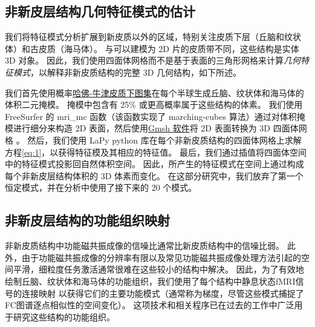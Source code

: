 \documentclass[lang=cn,a4paper,newtx,citestyle=gb7714-2015, bibstyle=gb7714-2015]{elegantpaper}
\begin{document}
\subsection{非新皮层结构几何特征模式的估计} \label{sec:geometric_estimation}

我们将特征模式分析扩展到新皮质以外的区域，特别关注皮质下层（丘脑和纹状体）和古皮质（海马体）。
与可以建模为 2D 片的皮质带不同，这些结构是实体 3D 对象。 
因此，我们使用四面体网格而不是基于表面的三角形网格来计算\textit{几何特征模式}，以解释非新皮质结构的完整 3D 几何结构\cite{wachinger2015brainprint}，如下所述。


我们首先使用概率\href{https://fsl.fmrib.ox.ac.uk/fsl/fslwiki/Atlases}{哈佛-牛津皮质下图集}在每个半球生成丘脑、纹状体和海马体的体积二元掩模。
掩模中包含有 25\% 或更高概率属于这些结构的体素。
我们使用 FreeSurfer 的 mri\_mc 函数（该函数实现了 marching-cubes 算法）通过对体积掩模进行细分来构造 2D 表面，然后使用\href{https://gmsh.info/}{Gmsh 软件}将 2D 表面转换为 3D 四面体网格 。
然后，我们使用 LaPy python 库在每个非新皮质结构的四面体网格上求解方程\ref{eq:1}，以获得特征模及其相应的特征值。
最后，我们通过插值将四面体空间中的特征模式投影回自然体积空间。
因此，所产生的特征模式在空间上通过构成每个非新皮层结构体积的 3D 体素而变化。
在这部分研究中，我们放弃了第一个恒定模式，并在分析中使用了接下来的 20 个模式。


\subsection{非新皮层结构的功能组织映射} \label{sec:functional_mapping}

非新皮质结构中功能磁共振成像的信噪比通常比新皮质结构中的信噪比弱\cite{uugurbil2013pushing}。
此外，由于功能磁共振成像的分辨率有限以及常见功能磁共振成像处理方法引起的空间平滑，细粒度任务激活通常很难在这些较小的结构中解决。
因此，为了有效地绘制丘脑、纹状体和海马体的功能组织，我们使用了每个结构中静息状态fMRI信号的连接映射\cite{haak2018connectopic} 以获得它们的主要功能模式（通常称为梯度，尽管这些模式捕捉了FC图谱逐点相似性的空间变化）。
这项技术和相关程序已在过去的工作中广泛用于研究这些结构的功能组织\cite{vos2018anatomical,yang2020thalamic,oldehinkel2022mapping}。
\end{document}
